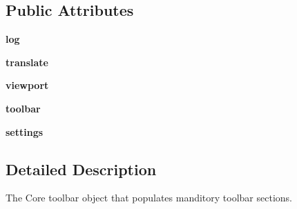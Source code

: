 \subsection*{Public Attributes}
\begin{DoxyCompactItemize}
\item 
\hypertarget{classcommotion__client_1_1GUI_1_1toolbar__builder_1_1ToolBar_a46cd8a80268c37d92f34582df33f3a01}{{\bfseries log}}\label{classcommotion__client_1_1GUI_1_1toolbar__builder_1_1ToolBar_a46cd8a80268c37d92f34582df33f3a01}

\item 
\hypertarget{classcommotion__client_1_1GUI_1_1toolbar__builder_1_1ToolBar_a1432d3836ec381328b3eb4a4491f7b96}{{\bfseries translate}}\label{classcommotion__client_1_1GUI_1_1toolbar__builder_1_1ToolBar_a1432d3836ec381328b3eb4a4491f7b96}

\item 
\hypertarget{classcommotion__client_1_1GUI_1_1toolbar__builder_1_1ToolBar_a63a7d3bd3d54d84b0d9f6b6da5c5572b}{{\bfseries viewport}}\label{classcommotion__client_1_1GUI_1_1toolbar__builder_1_1ToolBar_a63a7d3bd3d54d84b0d9f6b6da5c5572b}

\item 
\hypertarget{classcommotion__client_1_1GUI_1_1toolbar__builder_1_1ToolBar_a604f08b7bf5e7da96522fa20892aa68a}{{\bfseries toolbar}}\label{classcommotion__client_1_1GUI_1_1toolbar__builder_1_1ToolBar_a604f08b7bf5e7da96522fa20892aa68a}

\item 
\hypertarget{classcommotion__client_1_1GUI_1_1toolbar__builder_1_1ToolBar_a9d096d6696d3dbce5a61de16ab7206d2}{{\bfseries settings}}\label{classcommotion__client_1_1GUI_1_1toolbar__builder_1_1ToolBar_a9d096d6696d3dbce5a61de16ab7206d2}

\end{DoxyCompactItemize}


\subsection{Detailed Description}
\begin{DoxyVerb}The Core toolbar object that populates manditory toolbar sections.
\end{DoxyVerb}
 


